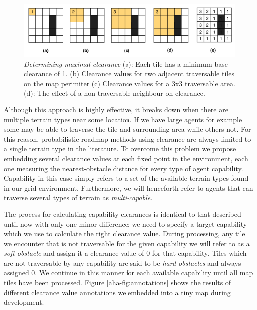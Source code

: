 \begin{figure}[htbp]
        \caption{\emph{Determining maximal clearance} (a): Each tile has a minimum base clearance of 1. (b) Clearance values for two adjacent traversable tiles on the map perimiter (c) Clearance values for a 3x3 traversable area. (d): The effect of a non-traversable neighbour on clearance. }
        \begin{center}
                        \includegraphics[scale=0.42]{diagrams/calculatingclearance.png}
        \end{center}
        \label{aha-fig:calculatingclearance}
\end{figure}

Although this approach is highly effective, it breaks down when there are multiple terrain types near some location. If we have large agents for example some may be able to traverse the tile and surrounding area while others not. For this reason, probabilistic roadmap methods using clearance are always limited to a single terrain type in the literature. To overcome this problem we propose embedding several clearance values at each fixed point in the environment, each one measuring the nearest-obstacle distance for every type of agent capability.  Capability in this case simply refers to a set of the available terrain types found in our grid environment. Furthermore, we will henceforth refer to agents that can traverse several types of terrain as \emph{multi-capable}.

The process for calculating capability clearances is identical to that described until now with only one minor difference: we need to specify a target capability which we use to calculate the right clearance value. During processing, any tile we encounter that is not traversable for the given capability we will refer to as a \emph{soft obstacle} and assign it a clearance value of 0 for that capability. Tiles which are not traversable by any capability are said to be \emph{hard obstacles} and always assigned 0.  We continue in this manner for each available capability until all map tiles have been processed. Figure \ref{aha-fig:annotations} shows the results of different clearance value annotations we embedded into a tiny map during development.

